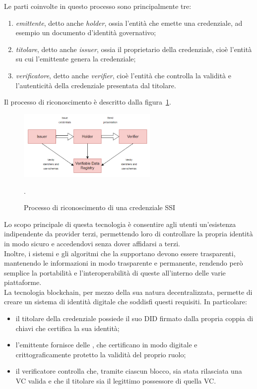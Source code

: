 Le parti coinvolte in questo processo sono principalmente tre:
\begin{enumerate}
    \item {\textit{emittente}, detto anche \textit{holder}}, ossia l'entità che emette una credenziale, ad esempio un documento d'identità governativo;
    \item {\textit{titolare}, detto anche \textit{issuer}}, ossia il proprietario della credenziale, cioè l'entità su cui l'emittente genera la credenziale;
    \item {\textit{verificatore}, detto anche \textit{verifier}}, cioè l'entità che controlla la validità e l'autenticità della credenziale presentata dal titolare.
\end{enumerate}  

Il processo di riconoscimento è descritto dalla figura~\ref{fig:ssi}.

\begin{figure}[h]
    \centering
    \includegraphics[width=0.6\textwidth, alt={Come funziona il riconoscimento nella SSI}]{immagini/ssi.png}
    \caption{Processo di riconoscimento di una credenziale SSI}\label{fig:ssi}.
\end{figure}


Lo scopo principale di questa tecnologia è consentire agli utenti un'esistenza indipendente da provider terzi, 
permettendo loro di controllare la propria identità in modo sicuro e accedendovi senza dover affidarsi a terzi. \\
Inoltre, i sistemi e gli algoritmi che la supportano devono essere trasparenti, mantenendo le informazioni in modo trasparente e permanente, rendendo però semplice 
la portabilità e l'interoperabilità di queste all'interno delle varie piattaforme. \\

La tecnologia blockchain, per mezzo della sua natura decentralizzata, permette di creare un sistema di identità digitale che soddisfi questi requisiti.
In particolare:
\begin{itemize}
    \item il titolare della credenziale possiede il suo DID firmato dalla propria coppia di chiavi che certifica la sua identità;
    \item l'emittente fornisce delle , che certificano in modo digitale e crittograficamente protetto la validità del proprio ruolo;
    \item il verificatore controlla che, tramite ciascun blocco, sia stata rilasciata una VC valida e che il titolare sia il legittimo possessore di quella VC.\@
\end{itemize}  

